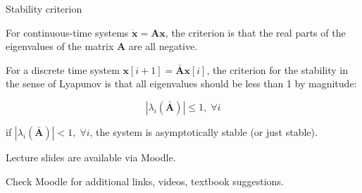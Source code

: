 \documentclass{beamer}
\begin{document}
\begin{frame}{Stability criterion}
\begin{flushleft}

For continuous-time systems $\dot {\mathbf x} = \mathbf A \mathbf x$, the criterion is that the real parts of the eigenvalues of the matrix $\mathbf A$ are all negative.

\bigskip

For a discrete time system $\mathbf x[i + 1] = \bar{\mathbf A} \mathbf x[i]$, the criterion for the stability in the sense of Lyapunov is that all eigenvalues should be less than 1 by magnitude:

\[
|\lambda_i(\bar{\mathbf A})| \leq 1, \; \forall i
\]

if $|\lambda_i(\bar{\mathbf A})| < 1, \; \forall i$, the system is asymptotically stable (or just stable).

\end{flushleft}
\end{frame}



\begin{frame}
\centerline{Lecture slides are available via Moodle.}
\bigskip
\centerline{Check Moodle for additional links, videos, textbook suggestions.}
\end{frame}
\end{document}
